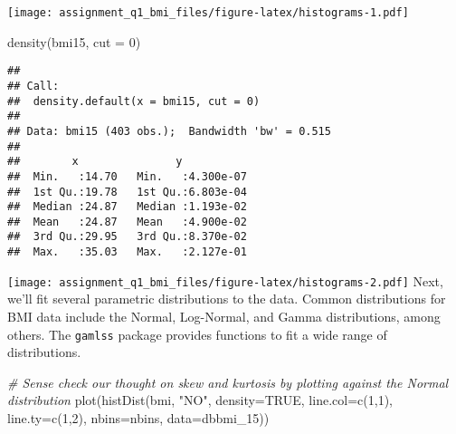 \documentclass[
]{article}
\newenvironment{Shaded}{\begin{snugshade}}{\end{snugshade}}
\newcommand{\AttributeTok}[1]{\textcolor[rgb]{0.77,0.63,0.00}{#1}}
\newcommand{\CommentTok}[1]{\textcolor[rgb]{0.56,0.35,0.01}{\textit{#1}}}
\newcommand{\ConstantTok}[1]{\textcolor[rgb]{0.00,0.00,0.00}{#1}}
\newcommand{\DecValTok}[1]{\textcolor[rgb]{0.00,0.00,0.81}{#1}}
\newcommand{\FunctionTok}[1]{\textcolor[rgb]{0.00,0.00,0.00}{#1}}
\newcommand{\NormalTok}[1]{#1}
\newcommand{\SpecialCharTok}[1]{\textcolor[rgb]{0.00,0.00,0.00}{#1}}
\newcommand{\StringTok}[1]{\textcolor[rgb]{0.31,0.60,0.02}{#1}}
\begin{document}
\texttt{[image: assignment\_q1\_bmi\_files/figure-latex/histograms-1.pdf]}

\begin{Shaded}
\begin{Highlighting}[]
\FunctionTok{density}\NormalTok{(bmi15, }\AttributeTok{cut =} \DecValTok{0}\NormalTok{)}
\end{Highlighting}
\end{Shaded}

\begin{verbatim}
## 
## Call:
##  density.default(x = bmi15, cut = 0)
## 
## Data: bmi15 (403 obs.);  Bandwidth 'bw' = 0.515
## 
##        x               y            
##  Min.   :14.70   Min.   :4.300e-07  
##  1st Qu.:19.78   1st Qu.:6.803e-04  
##  Median :24.87   Median :1.193e-02  
##  Mean   :24.87   Mean   :4.900e-02  
##  3rd Qu.:29.95   3rd Qu.:8.370e-02  
##  Max.   :35.03   Max.   :2.127e-01
\end{verbatim}

\begin{Shaded}
\end{Shaded}

\texttt{[image: assignment\_q1\_bmi\_files/figure-latex/histograms-2.pdf]}
Next, we'll fit several parametric distributions to the data. Common
distributions for BMI data include the Normal, Log-Normal, and Gamma
distributions, among others. The \texttt{gamlss} package provides
functions to fit a wide range of distributions.

\begin{Shaded}
\begin{Highlighting}[]
\CommentTok{\# Sense check our thought on skew and kurtosis by plotting against the Normal distribution}
\FunctionTok{plot}\NormalTok{(}\FunctionTok{histDist}\NormalTok{(bmi, }\StringTok{"NO"}\NormalTok{, }\AttributeTok{density=}\ConstantTok{TRUE}\NormalTok{, }\AttributeTok{line.col=}\FunctionTok{c}\NormalTok{(}\DecValTok{1}\NormalTok{,}\DecValTok{1}\NormalTok{), }\AttributeTok{line.ty=}\FunctionTok{c}\NormalTok{(}\DecValTok{1}\NormalTok{,}\DecValTok{2}\NormalTok{), }\AttributeTok{nbins=}\NormalTok{nbins, }\AttributeTok{data=}\NormalTok{dbbmi\_15))}
\end{Highlighting}
\end{Shaded}
\end{document}
